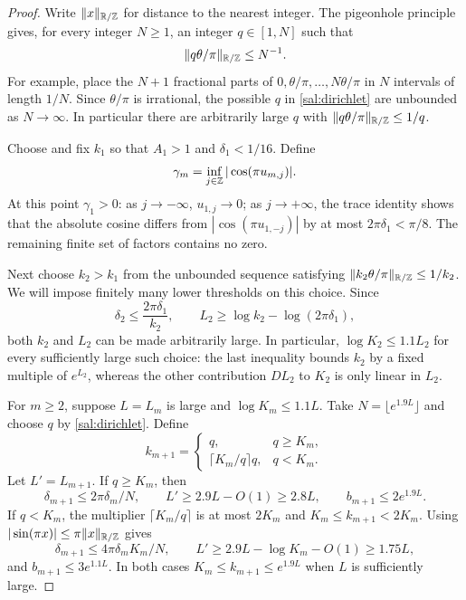 \begin{proof}
Write $\|x\|_{\mathbb R/\mathbb Z}$ for distance to the nearest integer.  The pigeonhole
principle gives, for every integer $N\ge1$, an integer $q\in[1,N]$ such
that
\begin{equation}\label{sal:dirichlet}
 \|q\theta/\pi\|_{\mathbb R/\mathbb Z}\le N^{-1}.
\end{equation}
For example, place the $N+1$ fractional parts of
$0,\theta/\pi,\ldots,N\theta/\pi$ in $N$ intervals of length $1/N$.
Since $\theta/\pi$ is irrational, the possible $q$ in
\eqref{sal:dirichlet} are unbounded as $N\to\infty$.  In particular there
are arbitrarily large $q$ with $\|q\theta/\pi\|_{\mathbb R/\mathbb Z}\le1/q$.

Choose and fix $k_1$ so that $A_1>1$ and $\delta_1<1/16$.  Define
\[
 \gamma_m=\inf_{j\in\mathbb Z}|\cos(\pi u_{m,j})|.
\]
At this point $\gamma_1>0$: as $j\to-\infty$, $u_{1,j}\to0$; as
$j\to+\infty$, the trace identity shows that the absolute cosine differs
from $|\cos(\pi u_{1,-j})|$ by at most $2\pi\delta_1<\pi/8$.
The remaining finite set of factors contains no zero.

Next choose $k_2>k_1$ from the unbounded sequence satisfying
$\|k_2\theta/\pi\|_{\mathbb R/\mathbb Z}\le1/k_2$.  We will impose finitely many
lower thresholds on this choice.  Since
\[
 \delta_2\le\frac{2\pi\delta_1}{k_2},\qquad
 L_2\ge\log k_2-\log(2\pi\delta_1),
\]
both $k_2$ and $L_2$ can be made arbitrarily large.  In particular,
$\log K_2\le1.1L_2$ for every sufficiently large such choice: the last
inequality bounds $k_2$ by a fixed multiple of $e^{L_2}$, whereas the
other contribution $DL_2$ to $K_2$ is only linear in $L_2$.

For $m\ge2$, suppose $L=L_m$ is large and $\log K_m\le1.1L$.
Take $N=\lfloor e^{1.9L}\rfloor$ and choose $q$ by
\eqref{sal:dirichlet}.  Define
\begin{equation}\label{sal:choice-k}
 k_{m+1}=\begin{cases}
 q,&q\ge K_m,\\
 \lceil K_m/q\rceil q,&q<K_m.
 \end{cases}
\end{equation}
Let $L'=L_{m+1}$.  If $q\ge K_m$, then
\[
 \delta_{m+1}\le2\pi\delta_m/N,\qquad
 L'\ge2.9L-O(1)\ge2.8L,
 \qquad b_{m+1}\le2e^{1.9L}.
\]
If $q<K_m$, the multiplier $\lceil K_m/q\rceil$ is at most $2K_m$
and $K_m\le k_{m+1}<2K_m$.  Using
$|\sin(\pi x)|\le\pi\|x\|_{\mathbb R/\mathbb Z}$ gives
\[
 \delta_{m+1}\le4\pi\delta_mK_m/N,
 \qquad L'\ge2.9L-\log K_m-O(1)\ge1.75L,
\]
and $b_{m+1}\le3e^{1.1L}$.  In both cases
$K_m\le k_{m+1}\le e^{1.9L}$ when $L$ is sufficiently large.


\end{proof}
